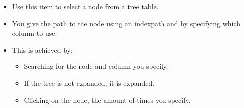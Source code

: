 
\begin{itemize}
\item Use this item to select a node from a tree table.
\item You give the path to the node using an indexpath and by specifying which column to use.
\item This is achieved by:
\begin{itemize}
\item Searching for the node and column you specify.
\item If the tree is not expanded, it is expanded.
\item Clicking on the node, the amount of times you specify. 
\end{itemize}
\end{itemize}
